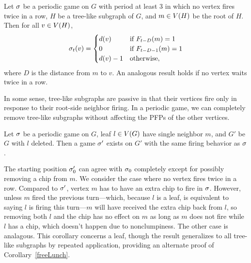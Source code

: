 \begin{cor}
Let $\s$ be a periodic game on $G$ with period at least 3 in which no vertex
fires twice in a row, $H$ be a tree-like subgraph of $G$, and $m \in \V[H]$ be
the root of $H$. Then for all $v \in \V[H]$,
\[
  \chips{v}{t} = \begin{cases}
    \deg{v} & \textnormal{if } \firing{m}{t-D} = 1 \\
    0 & \textnormal{if } \firing{m}{t-D-1} = 1 \\
    \deg{v} - 1 & \textnormal{otherwise},
  \end{cases}
\]
where $D$ is the distance from $m$ to $v$. An analogous result holds if no
vertex waits twice in a row.
\end{cor}

In some sense, tree-like subgraphs are passive in that their vertices fire only
in response to their root-side neighbor firing. In a periodic game, we can
completely remove tree-like subgraphs without affecting the PFPs of the other
vertices.

\begin{cor}
Let $\s$ be a periodic game on $G$, leaf $l \in \V$ have single neighbor $m$,
and $G'$ be $G$ with $l$ deleted. Then a game $\s'$ exists on $G'$ with the
same firing behavior as $\s$.
\end{cor}

The starting position $\pos[\s']{0}$ can agree with $\pos{0}$ completely except
for possibly removing a chip from $m$. We consider the case where no vertex
fires twice in a row. Compared to $\s'$, vertex $m$ has to have an extra chip
to fire in $\s$.  However, unless $m$ fired the previous turn---which, because
$l$ is a leaf, is equivalent to saying $l$ is firing this turn---$m$ will have
received the extra chip back from $l$, so removing both $l$ and the chip has no
effect on $m$ as long as $m$ does not fire while $l$ has a chip, which doesn't
happen due to nonclumpiness. The other case is analagous. This corollary
concerns a leaf, though the result generalizes to all tree-like subgraphs by
repeated application, providing an alternate proof of
Corollary~\ref{freeLunch}.
